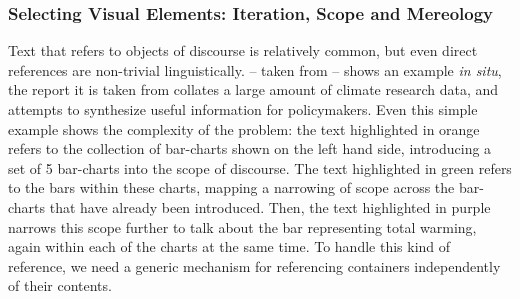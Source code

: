\subsubsection{Selecting Visual Elements: Iteration, Scope and Mereology}
Text that refers to objects of discourse is relatively common, but even direct references are non-trivial 
linguistically.  -- taken from \cite{lee23} -- shows an example \textit{in situ},
the report it is taken from collates a large amount of climate research data, and attempts to synthesize
useful information for policymakers. Even this simple example shows the complexity of the problem: the text highlighted
in orange refers to the collection of bar-charts shown on the left hand side, introducing a set of 5 bar-charts
into the scope of discourse. The text highlighted in green refers to the bars within these charts, mapping 
a narrowing of scope across the bar-charts that have already been introduced. Then, the text highlighted in
purple narrows this scope further to talk about the bar representing total warming, again within each of the
charts at the same time. To handle this kind of reference, we need a generic mechanism for referencing
containers independently of their contents.



